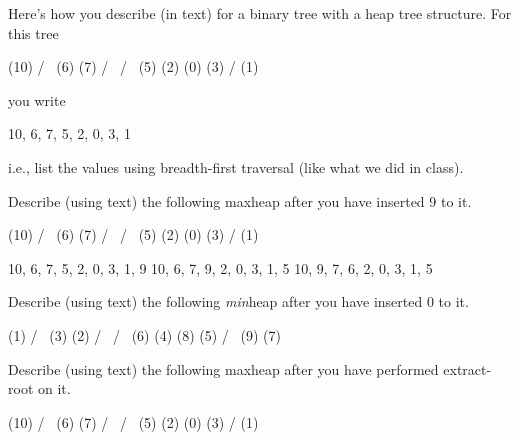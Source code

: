 

Here's how you describe (in text) for a binary tree with a heap tree structure.
For this tree
\begin{console}[fontsize=\footnotesize]
              (10)
           /        \
        (6)          (7)
       /   \        /   \
    (5)     (2)  (0)     (3)
   /
(1)
\end{console}
you write
\begin{console}[fontsize=\footnotesize]
{10, 6, 7, 5, 2, 0, 3, 1}
\end{console}
i.e., list the values using breadth-first traversal (like what we did in class).

\nextq
Describe (using text) the following maxheap after you have inserted 9 to it.
\begin{console}[fontsize=\footnotesize]
              (10)
           /        \
        (6)          (7)
       /   \        /   \
    (5)     (2)  (0)     (3)
   /
(1)
\end{console}

\ANSWER
\begin{answercode}
{10, 6, 7, 5, 2, 0, 3, 1, 9}
{10, 6, 7, 9, 2, 0, 3, 1, 5}
{10, 9, 7, 6, 2, 0, 3, 1, 5}
\end{answercode}

\nextq
Describe (using text) the following \textit{min}heap after you have inserted 0
to it.
\begin{console}[fontsize=\footnotesize]
              (1)
           /       \
        (3)         (2)
       /   \       /   \
    (6)     (4) (8)     (5)
   /   \
(9)     (7)
\end{console}

\ANSWER
\begin{answercode}
[1, 3, 2, 6, 4, 8, 5, 9, 7, 0]
[1, 3, 2, 6, 0, 8, 5, 9, 7, 4]
[1, 0, 2, 6, 3, 8, 5, 9, 7, 4]
[0, 1, 2, 6, 3, 8, 5, 9, 7, 4]
\end{answercode}

\nextq
Describe (using text) the following maxheap after you have performed
extract-root on it.
\begin{console}[fontsize=\footnotesize]
              (10)
           /        \
        (6)          (7)
       /   \        /   \
    (5)     (2)  (0)     (3)
   /
(1)
\end{console}

